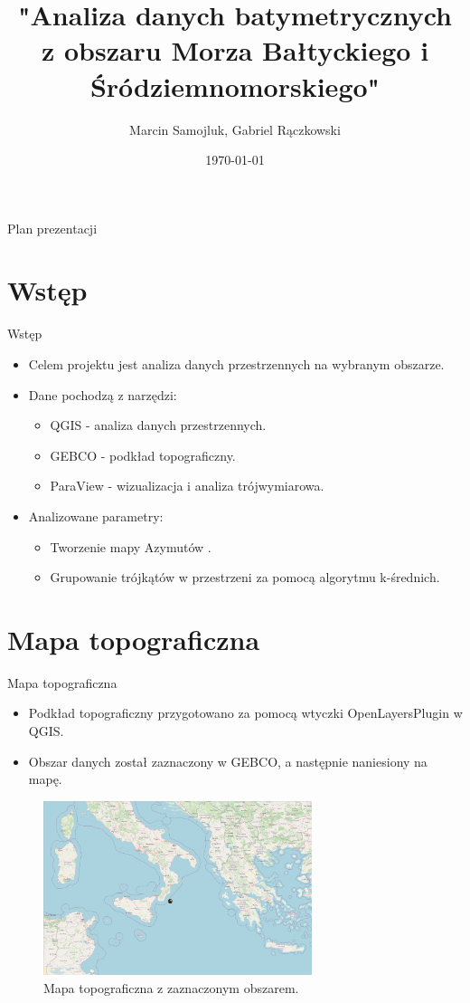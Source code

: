 \documentclass{beamer}
\title{ "Analiza danych batymetrycznych z 
	obszaru Morza Bałtyckiego i Śródziemnomorskiego" }
\author{Marcin Samojluk, Gabriel Rączkowski}
\date{\today}
\begin{document}
\frame{\titlepage}

\begin{frame}{Plan prezentacji}
    \tableofcontents
\end{frame}

\section{Wstęp}
\begin{frame}{Wstęp}
    \begin{itemize}
        \item Celem projektu jest analiza danych przestrzennych na wybranym obszarze.
        \item Dane pochodzą z narzędzi:
        \begin{itemize}
            \item QGIS - analiza danych przestrzennych.
            \item GEBCO - podkład topograficzny.
            \item ParaView - wizualizacja i analiza trójwymiarowa.
        \end{itemize}
        \item Analizowane parametry:
        \begin{itemize}
            \item Tworzenie mapy Azymutów .
            \item Grupowanie trójkątów w przestrzeni za pomocą algorytmu k-średnich.
        \end{itemize}
    \end{itemize}
\end{frame}

\section{Mapa topograficzna}
\begin{frame}{Mapa topograficzna}
    \begin{itemize}
        \item Podkład topograficzny przygotowano za pomocą wtyczki OpenLayersPlugin w QGIS.
        \item Obszar danych został zaznaczony w GEBCO, a następnie naniesiony na mapę.
    \end{itemize}
    \begin{figure}
        \includegraphics[width=0.7\textwidth]{topograf.png}
        \caption{Mapa topograficzna z zaznaczonym obszarem.}
    \end{figure}
\end{frame}
\end{document}
